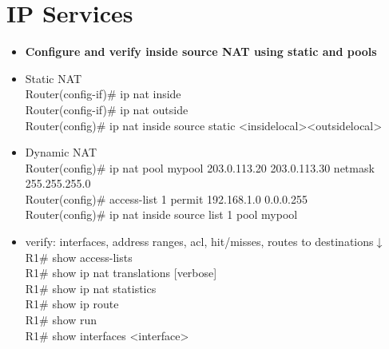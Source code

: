 \documentclass{article}
\begin{document}
\section{IP Services}
\begin{itemize}
  \item \textbf{Configure and verify inside source NAT using static and pools}
  	\item[] Static NAT\\
		Router(config-if)\# ip nat inside\\
		Router(config-if)\# ip nat outside\\
		Router(config)\# ip nat inside source static \textless inside\-local\textgreater \textless outside\-local\textgreater
	\item[] Dynamic NAT\\
		Router(config)\# ip nat pool mypool 203.0.113.20 203.0.113.30 netmask 255.255.255.0\\
		Router(config)\# access-list 1 permit 192.168.1.0 0.0.0.255\\
		Router(config)\# ip nat inside source list 1 pool mypool\\
	\item[] verify: interfaces, address ranges, acl, hit/misses, routes to destinations$\downarrow$\\
		R1\# show access-lists\\
		R1\# show ip nat translations [verbose]\\
		R1\# show ip nat statistics\\
		R1\# show ip route\\
		R1\# show run\\
		R1\# show interfaces \textless interface\textgreater
		

\end{itemize}
\end{document}
